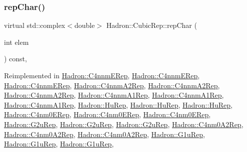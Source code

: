 \subsubsection{\texorpdfstring{repChar()}{repChar()}\hspace{0.1cm}{\footnotesize\ttfamily [2/3]}}
{\footnotesize\ttfamily virtual std\+::complex$<$double$>$ Hadron\+::\+Cubic\+Rep\+::rep\+Char (\begin{DoxyParamCaption}\item[{int}]{elem }\end{DoxyParamCaption}) const\hspace{0.3cm}{\ttfamily [inline]}, {\ttfamily [virtual]}}



Reimplemented in \mbox{\hyperlink{structHadron_1_1C4nnmERep_af3cb7f743630f5a14e38a10ee61dc9ff}{Hadron\+::\+C4nnm\+E\+Rep}}, \mbox{\hyperlink{structHadron_1_1C4nnmERep_af3cb7f743630f5a14e38a10ee61dc9ff}{Hadron\+::\+C4nnm\+E\+Rep}}, \mbox{\hyperlink{structHadron_1_1C4nnmERep_af3cb7f743630f5a14e38a10ee61dc9ff}{Hadron\+::\+C4nnm\+E\+Rep}}, \mbox{\hyperlink{structHadron_1_1C4nnmA2Rep_afb88da7160e06ad4085c5ed34d410bbc}{Hadron\+::\+C4nnm\+A2\+Rep}}, \mbox{\hyperlink{structHadron_1_1C4nnmA2Rep_afb88da7160e06ad4085c5ed34d410bbc}{Hadron\+::\+C4nnm\+A2\+Rep}}, \mbox{\hyperlink{structHadron_1_1C4nnmA2Rep_afb88da7160e06ad4085c5ed34d410bbc}{Hadron\+::\+C4nnm\+A2\+Rep}}, \mbox{\hyperlink{structHadron_1_1C4nnmA1Rep_a369d43e2f70764875daf2967ab976dad}{Hadron\+::\+C4nnm\+A1\+Rep}}, \mbox{\hyperlink{structHadron_1_1C4nnmA1Rep_a369d43e2f70764875daf2967ab976dad}{Hadron\+::\+C4nnm\+A1\+Rep}}, \mbox{\hyperlink{structHadron_1_1C4nnmA1Rep_a369d43e2f70764875daf2967ab976dad}{Hadron\+::\+C4nnm\+A1\+Rep}}, \mbox{\hyperlink{structHadron_1_1HuRep_a764617bf3dabef7cd69ffa034e550fff}{Hadron\+::\+Hu\+Rep}}, \mbox{\hyperlink{structHadron_1_1HuRep_a764617bf3dabef7cd69ffa034e550fff}{Hadron\+::\+Hu\+Rep}}, \mbox{\hyperlink{structHadron_1_1HuRep_a764617bf3dabef7cd69ffa034e550fff}{Hadron\+::\+Hu\+Rep}}, \mbox{\hyperlink{structHadron_1_1C4nm0ERep_ae2587ec63f886eaafedfaede40ebdba5}{Hadron\+::\+C4nm0\+E\+Rep}}, \mbox{\hyperlink{structHadron_1_1C4nm0ERep_ae2587ec63f886eaafedfaede40ebdba5}{Hadron\+::\+C4nm0\+E\+Rep}}, \mbox{\hyperlink{structHadron_1_1C4nm0ERep_ae2587ec63f886eaafedfaede40ebdba5}{Hadron\+::\+C4nm0\+E\+Rep}}, \mbox{\hyperlink{structHadron_1_1G2uRep_a51ea6b7795e07c824b72dbefb7fb6ddb}{Hadron\+::\+G2u\+Rep}}, \mbox{\hyperlink{structHadron_1_1G2uRep_a51ea6b7795e07c824b72dbefb7fb6ddb}{Hadron\+::\+G2u\+Rep}}, \mbox{\hyperlink{structHadron_1_1G2uRep_a51ea6b7795e07c824b72dbefb7fb6ddb}{Hadron\+::\+G2u\+Rep}}, \mbox{\hyperlink{structHadron_1_1C4nm0A2Rep_ad4d1ed2c8ee991654f7c1369f487a810}{Hadron\+::\+C4nm0\+A2\+Rep}}, \mbox{\hyperlink{structHadron_1_1C4nm0A2Rep_ad4d1ed2c8ee991654f7c1369f487a810}{Hadron\+::\+C4nm0\+A2\+Rep}}, \mbox{\hyperlink{structHadron_1_1C4nm0A2Rep_ad4d1ed2c8ee991654f7c1369f487a810}{Hadron\+::\+C4nm0\+A2\+Rep}}, \mbox{\hyperlink{structHadron_1_1G1uRep_a3d37407f93af4c955c024aafa0948bcb}{Hadron\+::\+G1u\+Rep}}, \mbox{\hyperlink{structHadron_1_1G1uRep_a3d37407f93af4c955c024aafa0948bcb}{Hadron\+::\+G1u\+Rep}}, \mbox{\hyperlink{structHadron_1_1G1uRep_a3d37407f93af4c955c024aafa0948bcb}{Hadron\+::\+G1u\+Rep}}, 